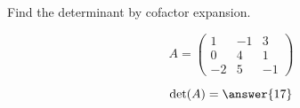 \documentclass{ximera}
\author{Parisa Fatheddin}
\begin{document}
\begin{exercise}


Find the determinant by cofactor expansion.

\[
A = \begin{pmatrix}
1 & -1 & 3\\
0 & 4 & 1\\
-2 & 5 & -1
\end{pmatrix}
\]

\begin{prompt}
  \[
    \det(A)
    = \answer{17}
  \]
\end{prompt}








\end{exercise}
\end{document}
